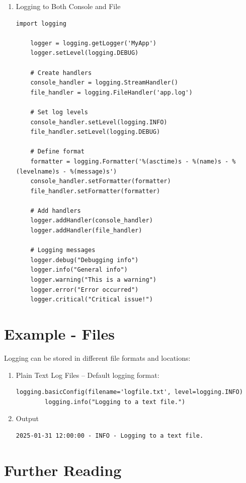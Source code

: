 \begin{enumerate}
	\item Logging to Both Console and File
	\begin{lstlisting}[style=pythonstyle]
	import logging
	
	logger = logging.getLogger('MyApp')
	logger.setLevel(logging.DEBUG)
	
	# Create handlers
	console_handler = logging.StreamHandler()
	file_handler = logging.FileHandler('app.log')
	
	# Set log levels
	console_handler.setLevel(logging.INFO)
	file_handler.setLevel(logging.DEBUG)
	
	# Define format
	formatter = logging.Formatter('%(asctime)s - %(name)s - %(levelname)s - %(message)s')
	console_handler.setFormatter(formatter)
	file_handler.setFormatter(formatter)
	
	# Add handlers
	logger.addHandler(console_handler)
	logger.addHandler(file_handler)
	
	# Logging messages
	logger.debug("Debugging info")
	logger.info("General info")
	logger.warning("This is a warning")
	logger.error("Error occurred")
	logger.critical("Critical issue!")
	\end{lstlisting}
	
\end{enumerate}

\section{Example - Files}
Logging can be stored in different file formats and locations:

\begin{enumerate}
	\item Plain Text Log Files – Default logging format:
	\begin{lstlisting}[style=pythonstyle]
		logging.basicConfig(filename='logfile.txt', level=logging.INFO)
		logging.info("Logging to a text file.")
	\end{lstlisting}
	
	\item Output
		\begin{lstlisting}[style=bashstyle]
	2025-01-31 12:00:00 - INFO - Logging to a text file.
	\end{lstlisting}
	
\end{enumerate}

\section{Further Reading}



\nocite{Abadi:2016}

   \printbibliography[heading=subbibliography, segment=\therefsegment]










